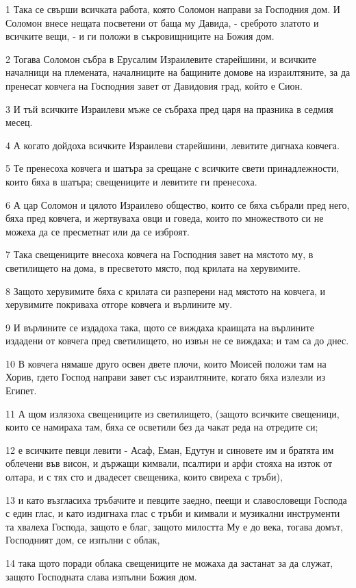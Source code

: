 \par 1 Така се свърши всичката работа, която Соломон направи за Господния дом. И Соломон внесе нещата посветени от баща му Давида, - среброто златото и всичките вещи, - и ги положи в съкровищниците на Божия дом.
\par 2 Тогава Соломон събра в Ерусалим Израилевите старейшини, и всичките началници на племената, началниците на бащините домове на израилтяните, за да пренесат ковчега на Господния завет от Давидовия град, който е Сион.
\par 3 И тъй всичките Израилеви мъже се събраха пред царя на празника в седмия месец.
\par 4 А когато дойдоха всичките Израилеви старейшини, левитите дигнаха ковчега.
\par 5 Те пренесоха ковчега и шатъра за срещане с всичките свети принадлежности, които бяха в шатъра; свещениците и левитите ги пренесоха.
\par 6 А цар Соломон и цялото Израилево общество, които се бяха събрали пред него, бяха пред ковчега, и жертвуваха овци и говеда, които по множеството си не можеха да се пресметнат или да се изброят.
\par 7 Така свещениците внесоха ковчега на Господния завет на мястото му, в светилището на дома, в пресветото място, под крилата на херувимите.
\par 8 Защото херувимите бяха с крилата си разперени над мястото на ковчега, и херувимите покриваха отгоре ковчега и върлините му.
\par 9 И върлините се издадоха така, щото се виждаха краищата на върлините издадени от ковчега пред светилището, но извън не се виждаха; и там са до днес.
\par 10 В ковчега нямаше друго освен двете плочи, които Моисей положи там на Хорив, гдето Господ направи завет със израилтяните, когато бяха излезли из Египет.
\par 11 А щом излязоха свещениците из светилището, (защото всичките свещеници, които се намираха там, бяха се осветили без да чакат реда на отредите си;
\par 12 е всичките певци левити - Асаф, Еман, Едутун и синовете им и братята им облечени във висон, и държащи кимвали, псалтири и арфи стояха на изток от олтара, и с тях сто и двадесет свещеника, които свиреха с тръби),
\par 13 и като възгласиха тръбачите и певците заедно, пеещи и славословещи Господа с един глас, и като издигнаха глас с тръби и кимвали и музикални инструменти та хвалеха Господа, защото е благ, защото милостта Му е до века, тогава домът, Господният дом, се изпълни с облак,
\par 14 така щото поради облака свещениците не можаха да застанат за да служат, защото Господната слава изпълни Божия дом.

